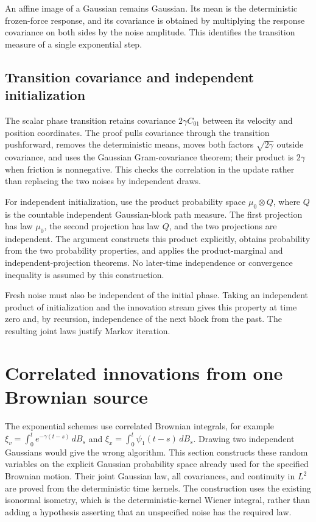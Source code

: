 \documentclass[11pt,a4paper]{report}
\begin{document}
An affine image of a Gaussian remains Gaussian. Its mean is the deterministic frozen-force response, and its covariance is obtained by multiplying the response covariance on both sides by the noise amplitude. This identifies the transition measure of a single exponential step.

\subsection{\texorpdfstring{Transition covariance and independent initialization}{Transition covariance and independent initialization}}
\label{report-step-KineticLangevin-Gaussian-lean-8}


The scalar phase transition retains covariance \(2\gamma C_{01}\) between its velocity and position coordinates. The proof pulls covariance through the transition pushforward, removes the deterministic means, moves both factors \(\sqrt{2\gamma}\) outside covariance, and uses the Gaussian Gram-covariance theorem; their product is \(2\gamma\) when friction is nonnegative. This checks the correlation in the update rather than replacing the two noises by independent draws.



For independent initialization, use the product probability space \(\mu_0\otimes Q\), where \(Q\) is the countable independent Gaussian-block path measure. The first projection has law \(\mu_0\), the second projection has law \(Q\), and the two projections are independent. The argument constructs this product explicitly, obtains probability from the two probability properties, and applies the product-marginal and independent-projection theorems. No later-time independence or convergence inequality is assumed by this construction.



Fresh noise must also be independent of the initial phase. Taking an independent product of initialization and the innovation stream gives this property at time zero and, by recursion, independence of the next block from the past. The resulting joint laws justify Markov iteration.

\section{\texorpdfstring{Correlated innovations from one Brownian source}{Correlated innovations from one Brownian source}}
\label{proof-module-KineticLangevin-BrownianConvolution-lean}


The exponential schemes use correlated Brownian integrals, for example \(\xi_v=\int_0^t e^{-\gamma(t-s)}\,dB_s\) and \(\xi_x=\int_0^t\psi_1(t-s)\,dB_s\). Drawing two independent Gaussians would give the wrong algorithm. This section constructs these random variables on the explicit Gaussian probability space already used for the specified Brownian motion. Their joint Gaussian law, all covariances, and continuity in \(L^{2}\) are proved from the deterministic time kernels. The construction uses the existing isonormal isometry, which is the deterministic-kernel Wiener integral, rather than adding a hypothesis asserting that an unspecified noise has the required law.
\end{document}
